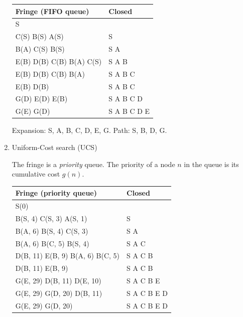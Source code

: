 \documentclass[11pt, a4paper]{article}
\begin{document}
\begin{enumerate}
\begin{solution}
        \begin{table}[h]
            \centering
            \begin{tabular}{l|l}
                \toprule
                Fringe (FIFO queue) & Closed \\
                \midrule
                S & \\
                C(S) B(S) A(S) & S \\
                B(A) C(S) B(S) & S A \\
                E(B) D(B) C(B) B(A) C(S) & S A B \\
                E(B) D(B) C(B) B(A) & S A B C \\
                E(B) D(B) & S A B C \\
                G(D) E(D) E(B) & S A B C D \\
                G(E) G(D) & S A B C D E \\
                \bottomrule
            \end{tabular}
        \end{table}

        Expansion: S, A, B, C, D, E, G. Path: S, B, D, G.
    \end{solution}


    \item Uniform-Cost search (UCS)

    \begin{solution}
        The fringe is a \emph{priority} queue. The priority of a node $n$ in the queue is its cumulative cost $g(n)$.

        \begin{table}[h]
            \centering
            \begin{tabular}{l|l}
                \toprule
                Fringe (priority queue) & Closed \\
                \midrule
                S(0) & \\
                B(S, 4) C(S, 3) A(S, 1) & S \\
                B(A, 6) B(S, 4) C(S, 3) & S A \\
                B(A, 6) B(C, 5) B(S, 4) & S A C \\
                D(B, 11) E(B, 9) B(A, 6) B(C, 5) & S A C B \\
                D(B, 11) E(B, 9) & S A C B \\
                G(E, 29) D(B, 11) D(E, 10) & S A C B E \\
                G(E, 29) G(D, 20) D(B, 11) & S A C B E D \\
                G(E, 29) G(D, 20) & S A C B E D \\
                \bottomrule
            \end{tabular}
        \end{table}


\end{solution}
\end{enumerate}
\end{document}
